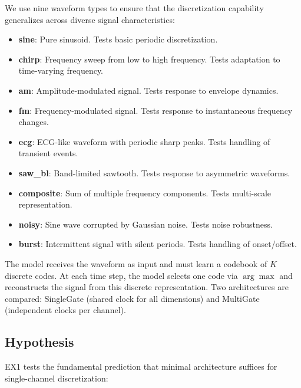 \documentclass{article}
\begin{document}
We use nine waveform types to ensure that the discretization capability generalizes across diverse signal characteristics:
\begin{itemize}
    \item \textbf{sine}: Pure sinusoid. Tests basic periodic discretization.
    \item \textbf{chirp}: Frequency sweep from low to high frequency. Tests adaptation to time-varying frequency.
    \item \textbf{am}: Amplitude-modulated signal. Tests response to envelope dynamics.
    \item \textbf{fm}: Frequency-modulated signal. Tests response to instantaneous frequency changes.
    \item \textbf{ecg}: ECG-like waveform with periodic sharp peaks. Tests handling of transient events.
    \item \textbf{saw\_bl}: Band-limited sawtooth. Tests response to asymmetric waveforms.
    \item \textbf{composite}: Sum of multiple frequency components. Tests multi-scale representation.
    \item \textbf{noisy}: Sine wave corrupted by Gaussian noise. Tests noise robustness.
    \item \textbf{burst}: Intermittent signal with silent periods. Tests handling of onset/offset.
\end{itemize}

The model receives the waveform as input and must learn a codebook of $K$ discrete codes. At each time step, the model selects one code via $\arg\max$ and reconstructs the signal from this discrete representation. Two architectures are compared: SingleGate (shared clock for all dimensions) and MultiGate (independent clocks per channel).

\subsection{Hypothesis}
EX1 tests the fundamental prediction that minimal architecture suffices for single-channel discretization:
\end{document}
